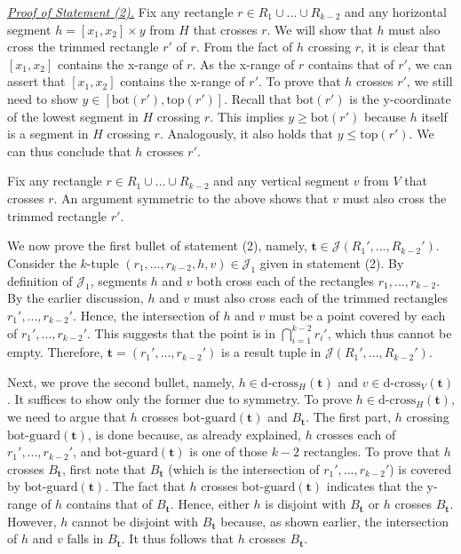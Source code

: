 \documentclass[sigconf]{acmart}
\def\vgap{\vspace{0mm}}
\def\J{\mathcal{J}}
\def\ybot{\mathrm{bot}}
\def\ytop{\mathrm{top}}
\def\gbot{\mathrm{bot\text{-}guard}}
\def\dcross{\mathrm{d\text{-}cross}}
\begin{document}
{{{\vgap

\noindent \underline{\em Proof of Statement (2).} Fix any rectangle $r \in R_1 \cup ... \cup R_{k-2}$ and any horizontal segment $h = [x_1, x_2] \times y$ from $H$ that crosses $r$. We will show that $h$ must also cross the trimmed rectangle $r'$ of $r$. From the fact of $h$ crossing $r$, it is clear that $[x_1, x_2]$ contains the x-range of $r$. As the x-range of $r$ contains that of $r'$, we can assert that $[x_1, x_2]$ contains the x-range of $r'$. To prove that $h$ crosses $r'$, we still need to show $y \in [\ybot(r'), \ytop(r')]$. Recall that $\ybot(r')$ is the y-coordinate of the lowest segment in $H$ crossing $r$. This implies $y \ge \ybot(r')$ because $h$ itself is a segment in $H$ crossing $r$. Analogously, it also holds that $y \le \ytop(r')$. We can thus conclude that $h$ crosses $r'$. 

\vgap

Fix any rectangle $r \in R_1 \cup ... \cup R_{k-2}$ and any vertical segment $v$ from $V$ that crosses $r$. An argument symmetric to the above shows that $v$ must also cross the trimmed rectangle $r'$.

\vgap

We now prove the first bullet of statement (2), namely, $\bm{t}\in \J(R_1',...,R_{k-2}')$. Consider the $k$-tuple $(r_1,...,r_{k-2},h,v)\in \J_1$ given in statement (2). By definition of $\J_1$, segments $h$ and $v$ both cross each of the rectangles $r_1,..., r_{k-2}$. By the earlier discussion, $h$ and $v$ must also cross each of the trimmed rectangles $r_1',..., r_{k-2}'$. Hence, the intersection of $h$ and $v$ must be a point covered by each of $r_1',..., r_{k-2}'$. This suggests that the point is in $\bigcap_{i = 1}^{k-2}r_i'$, which thus cannot be empty. Therefore, $\bm{t} = (r_1', ..., r_{k-2}')$ is a result tuple in $\J(R_1',...,R_{k-2}')$. 

\vgap 

Next, we prove the second bullet, namely, $h \in \dcross_H(\bm{t})$ and $v \in \dcross_V(\bm{t})$. It suffices to show only the former due to symmetry. To prove $h \in \dcross_H(\bm{t})$, we need to argue that $h$ crosses $\gbot(\bm{t})$ and $B_\bm{t}$. The first part, $h$ crossing $\gbot(\bm{t})$, is done because, as already explained, $h$ crosses each of $r_1', ..., r_{k-2}'$, and $\gbot(\bm{t})$ is one of those $k-2$ rectangles. To prove that $h$ crosses $B_\bm{t}$, first note that $B_\bm{t}$ (which is the intersection of $r_1', ..., r_{k-2}'$) is covered by $\gbot(\bm{t})$. The fact that $h$ crosses $\gbot(\bm{t})$ indicates that the y-range of $h$ contains that of $B_\bm{t}$. Hence, either $h$ is disjoint with $B_\bm{t}$ or $h$ crosses $B_\bm{t}$. However, $h$ cannot be disjoint with $B_\bm{t}$ because, as shown earlier, the intersection of $h$ and $v$ falls in $B_\bm{t}$. It thus follows that $h$ crosses $B_\bm{t}$.

}}}
\end{document}
